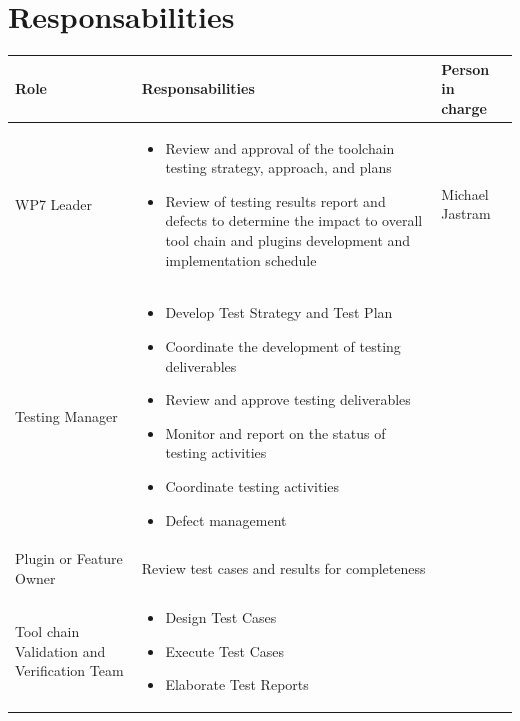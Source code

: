 \section{Responsabilities}
\begin{center}
\begin{longtable}[H]{|p{3cm}|p{8cm}|p{4cm}|}\hline
\textbf{Role} & \textbf{Responsabilities} & \textbf{Person in charge}\\\hline
WP7 Leader & \begin{itemize}
\item Review and approval of the toolchain testing strategy, approach, and plans
\item Review of testing results report and defects to determine the impact to overall tool chain and plugins  development and implementation schedule
\end{itemize}  
 & Michael Jastram\\\hline
Testing Manager & \begin{itemize}
\item Develop Test Strategy and Test Plan
\item Coordinate the development of testing deliverables
\item Review and approve testing deliverables
\item Monitor and report on the status of testing activities
\item Coordinate testing activities
\item Defect management
\end{itemize}  
 & \\\hline
Plugin or Feature Owner & Review test cases and results for completeness & \\\hline
Tool chain Validation and Verification Team & \begin{itemize}
\item Design Test Cases
\item Execute Test Cases
\item Elaborate Test Reports
\end{itemize}
& \\\hline
\end{longtable}
\end{center}

